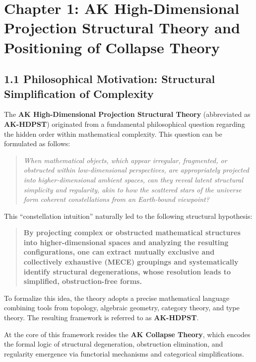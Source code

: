 \documentclass[11pt]{article}
\begin{document}
\section{Chapter 1: AK High-Dimensional Projection Structural Theory and Positioning of Collapse Theory}

\subsection*{1.1 Philosophical Motivation: Structural Simplification of Complexity}

The \textbf{AK High-Dimensional Projection Structural Theory} (abbreviated as \textbf{AK-HDPST}) originated from a fundamental philosophical question regarding the hidden order within mathematical complexity. This question can be formulated as follows:

\begin{quote}
\textit{
When mathematical objects, which appear irregular, fragmented, or obstructed within low-dimensional perspectives,  
are appropriately projected into higher-dimensional ambient spaces,  
can they reveal latent structural simplicity and regularity, akin to how the scattered stars of the universe form coherent constellations from an Earth-bound viewpoint?  
}
\end{quote}

This ``constellation intuition'' naturally led to the following structural hypothesis:

\begin{quote}
\textbf{By projecting complex or obstructed mathematical structures into higher-dimensional spaces and analyzing the resulting configurations,  
one can extract mutually exclusive and collectively exhaustive (MECE) groupings and systematically identify structural degenerations,  
whose resolution leads to simplified, obstruction-free forms.}
\end{quote}

To formalize this idea, the theory adopts a precise mathematical language combining tools from topology, algebraic geometry, category theory, and type theory. The resulting framework is referred to as \textbf{AK-HDPST}.

At the core of this framework resides the \textbf{AK Collapse Theory}, which encodes the formal logic of structural degeneration, obstruction elimination, and regularity emergence via functorial mechanisms and categorical simplifications.
\end{document}
